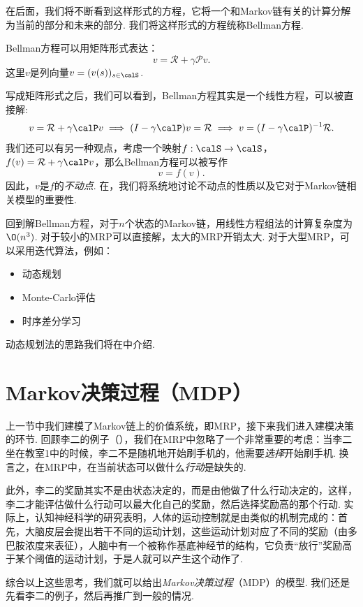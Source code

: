 在后面，我们将不断看到这样形式的方程，它将一个和Markov链有关的计算分解为当前的部分和未来的部分. 我们将这样形式的方程统称Bellman方程. 

Bellman方程可以用矩阵形式表达：
        \[v = \mathcal R + \gamma \mathcal P v.\]
这里$v$是列向量$v=(v(s))_{s\in\calS}$.

写成矩阵形式之后，我们可以看到，Bellman方程其实是一个线性方程，可以被直接解:
\[
    v =\mathcal R + \gamma \calP v \implies (I-\gamma \calP)v = \mathcal R \implies v = (I-\gamma \calP)^{-1} \mathcal R.
\]
我们还可以有另一种观点，考虑一个映射$f:\calS\to \calS$，$f(v)=\mathcal R + \gamma \calP v$，那么Bellman方程可以被写作
\[v=f(v).\]
因此，$v$是$f$的\emph{不动点}. 在，我们将系统地讨论不动点的性质以及它对于Markov链相关模型的重要性.

回到解Bellman方程，对于$n$个状态的Markov链，用线性方程组法的计算复杂度为$\O(n^3)$. 对于较小的MRP可以直接解，太大的MRP开销太大. 对于大型MRP，可以采用迭代算法，例如：
\begin{itemize}
    \item {}动态规划
    \item {}Monte-Carlo评估
    \item {}时序差分学习
\end{itemize}
动态规划法的思路我们将在中介绍.

\section{Markov决策过程（MDP）}\label{sec:MDP}

上一节中我们建模了Markov链上的价值系统，即MRP，接下来我们进入建模决策的环节. 回顾李二的例子（），我们在MRP中忽略了一个非常重要的考虑：当李二坐在教室1中的时候，李二不是随机地开始刷手机的，他需要\emph{选择}开始刷手机. 换言之，在MRP中，在当前状态可以做什么\emph{行动}是缺失的. 

此外，李二的奖励其实不是由状态决定的，而是由他做了什么行动决定的，这样，李二才能评估做什么行动可以最大化自己的奖励，然后选择奖励高的那个行动. 实际上，认知神经科学的研究表明，人体的运动控制就是由类似的机制完成的：首先，大脑皮层会提出若干不同的运动计划，这些运动计划对应了不同的奖励（由多巴胺浓度来表征），人脑中有一个被称作基底神经节的结构，它负责“放行”奖励高于某个阈值的运动计划，于是人就可以产生这个动作了. 

综合以上这些思考，我们就可以给出\emph{Markov决策过程}（MDP）的模型. 我们还是先看李二的例子，然后再推广到一般的情况. 

